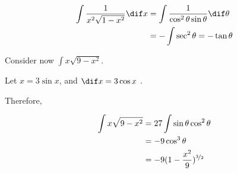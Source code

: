 \documentclass[11pt]{scrartcl}
\begin{document}
\begin{example}

  \begin{align}
    \int \frac{1}{x^2 \sqrt{1-x^2}}\dif x &= \int \frac{1}{\cos^2\theta\sin\theta}\dif\theta\\
    &= -\int \sec^2\theta = -\tan \theta
  \end{align}
\end{example}

\begin{example}

  Consider now $\int x \sqrt{9-x^2}$.

  Let $x=3\sin x$, and $\dif x = 3\cos x$ .

  Therefore,

  \begin{align}
    \int x \sqrt{9-x^2} & = 27\int \sin \theta \cos^2\theta \\
                        & = -9 \cos ^3\theta                \\
                        & =-9(1-\frac{x^2}{9})^{\nicefrac{3}{2}}
  \end{align}

\end{example}
\end{document}
